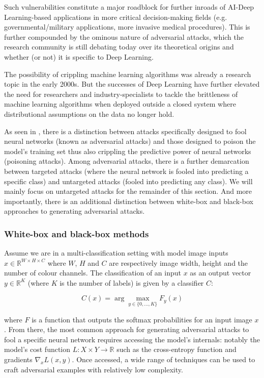 \vspace{0.2cm}

Such vulnerabilities constitute a major roadblock for further inroads of AI-Deep Learning-based applications in more critical decision-making fields (e.g. governmental/military applications, more invasive medical procedures). This is further compounded by the ominous nature of adversarial attacks, which the research community is still debating today over its theoretical origins and whether (or not) it is specific to Deep Learning.

The possibility of crippling machine learning algorithms was already a research topic in the early 2000s. But the successes of Deep Learning have further elevated the need for researchers and industry-specialists to tackle the brittleness of machine learning algorithms when deployed outside a closed system where distributional assumptions on the data no longer hold.

As seen in \cite{Nicolae2018AdversarialRT}, there is a distinction between attacks specifically designed to fool neural networks (known as adversarial attacks) and those designed to poison the model's training set thus also crippling the predictive power of neural networks (poisoning attacks). Among adversarial attacks, there is a further demarcation between targeted attacks (where the neural network is fooled into predicting a specific class) and untargeted attacks (fooled into predicting any class). We will mainly focus on untargeted attacks for the remainder of this section. And more importantly, there is an additional distinction between white-box and black-box approaches to generating adversarial attacks.


\subsubsection{White-box and black-box methods}

Assume we are in a multi-classification setting with model image inputs $ x \in \mathbb{R}^{W \times H \times C} $ where $W$, $H$ and $C$ are respectively image width, height and the number of colour channels. The classification of an input $x$ as an output vector $y \in \mathbb{R}^K $ (where $K$ is the number of labels)  is given by a classifier $C$:

$$ C(x) = \arg \max_{y\in \{0,...,K\}} F_y (x) $$

where $F$ is a function that outputs the softmax probabilities for an input image $x$. From there, the most common approach for generating adversarial attacks to fool a specific neural network requires accessing the model's internals: notably the model's cost function $L: X \times Y \rightarrow \mathbb{R} $ such as the cross-entropy function and gradients $\nabla_x L(x,y)$. Once accessed, a wide range of techniques can be used to craft adversarial examples with relatively low complexity.

